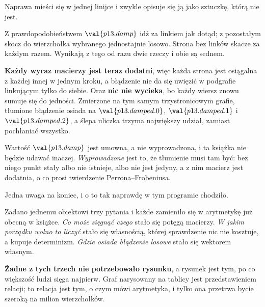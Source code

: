 \begin{fr}
Naprawa mieści się w jednej linijce i zwykle opisuje się ją jako sztuczkę,
którą nie jest.

Z prawdopodobieństwem $\val{p13.damp}$ idź za linkiem jak dotąd; z pozostałym
skocz do wierzchołka wybranego jednostajnie losowo. Strona bez linków skacze za
każdym razem. Wynikają z tego od razu dwie rzeczy i obie są sednem.

\textbf{Każdy wyraz macierzy jest teraz dodatni}, więc każda strona jest
osiągalna z każdej innej w jednym kroku, a błądzenie nie da się uwięzić w
podgrafie linkującym tylko do siebie. Oraz \textbf{nic nie wycieka}, bo każdy
wiersz znowu sumuje się do jedności. Zmierzone na tym samym trzystronicowym
grafie, tłumione błądzenie osiada na $\val{p13.damped.0}$,
$\val{p13.damped.1}$ i $\val{p13.damped.2}$, a ślepa uliczka trzyma największy
udział, zamiast pochłaniać wszystko.

\begin{note}
Wartość $\val{p13.damp}$ jest umowna, a nie wyprowadzona, i ta książka nie
będzie udawać inaczej. \emph{Wyprowadzone} jest to, że tłumienie musi tam być:
bez niego punkt stały albo nie istnieje, albo nie jest jedyny, a z nim macierz
jest dodatnia, o co prosi twierdzenie Perrona--Frobeniusa.
\end{note}
\end{fr}

\begin{fr}
Jedna uwaga na koniec, i o to tak naprawdę w tym programie chodziło.

Zadano jednemu obiektowi trzy pytania i każde zamieniło się w arytmetykę już
obecną w książce. \emph{Co może sięgnąć czego} stało się potęgą macierzy. \emph{W
jakim porządku wolno to liczyć} stało się własnością, której sprawdzenie nic
nie kosztuje, a kupuje determinizm. \emph{Gdzie osiada błądzenie losowe} stało
się wektorem własnym.

\textbf{Żadne z tych trzech nie potrzebowało rysunku}, a rysunek jest tym, po
co większość ludzi sięga najpierw. Graf narysowany na tablicy jest
przedstawieniem relacji; to relacja jest tym, o czym mówi arytmetyka, i tylko
ona przetrwa bycie szeroką na milion wierzchołków.
\end{fr}


